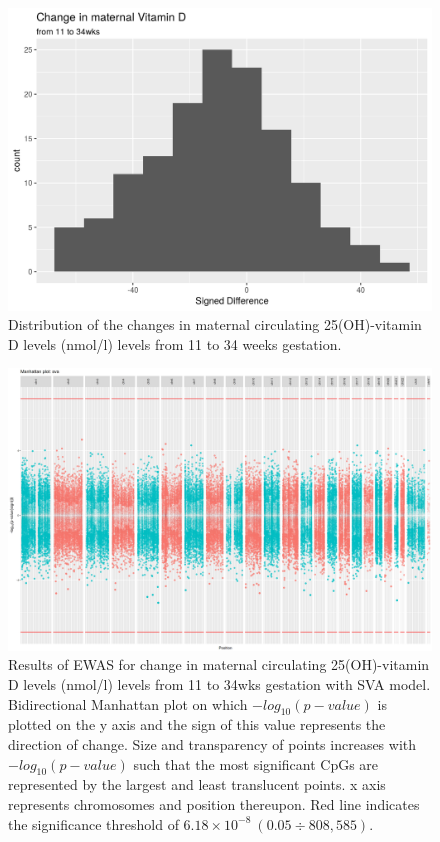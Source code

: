 \documentclass[
]{book}
\begin{document}
\begin{figure}

{\centering \includegraphics[width=0.8\linewidth]{figs/MAVIDOSdifVD} 

}

\caption{Distribution of the changes in maternal circulating 25(OH)-vitamin D levels (nmol/l) levels from 11 to 34 weeks gestation.}\label{fig:MAVIDOSdifVD}
\end{figure}



\begin{figure}

{\centering \includegraphics[width=0.8\linewidth]{figs/MAVIDOSdifVDEPICewasManhattanSVA} 

}

\caption{Results of EWAS for change in maternal circulating 25(OH)-vitamin D levels (nmol/l) levels from 11 to 34wks gestation with SVA model. Bidirectional Manhattan plot on which \(-log_{10}(p-value)\) is plotted on the y axis and the sign of this value represents the direction of change. Size and transparency of points increases with \(-log_{10}(p-value)\) such that the most significant CpGs are represented by the largest and least translucent points. x axis represents chromosomes and position thereupon. Red line indicates the significance threshold of \(6.18\times10^{-8}~(0.05\div808,585)\).}\label{fig:MAVIDOSdifVDEPICewasManhattanSVA}
\end{figure}
\end{document}
